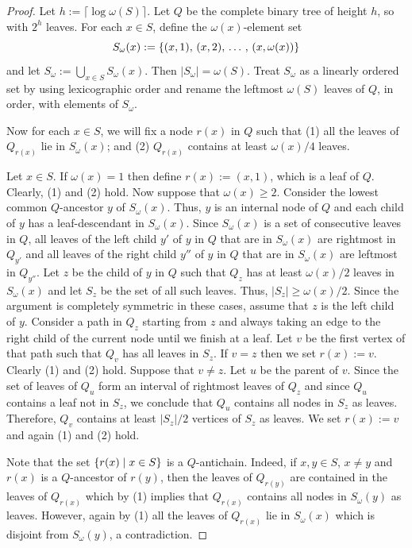 \documentclass{patmorin}
\renewcommand{\geq}{\geqslant}
\DeclarePairedDelimiter{\set}{\{}{\}}
\begin{document}
\begin{proof}
  Let $h:=\lceil\log\omega(S)\rceil$.
  Let $Q$ be the complete binary tree of height $h$, so with $2^h$ leaves.
  For each $x\in S$, define the $\omega(x)$-element set
  \[  S_{\omega}(x):=\set{(x,1),\,(x,2),\,\ldots\,,\,(x,\omega(x))}\]
  and let $S_\omega:=\bigcup_{x\in S}S_{\omega}(x)$.  Then $|S_\omega|=\omega(S)$.  Treat $S_{\omega}$ as a linearly ordered set by using lexicographic order and rename the leftmost $\omega(S)$ leaves of $Q$, in order, with elements of $S_{\omega}$.

  Now for each $x\in S$, we will fix a node $r(x)$ in $Q$ such that
  (1) all the leaves of $Q_{r(x)}$ lie in $S_{\omega}(x)$; and
  (2) $Q_{r(x)}$ contains at least $\omega(x)/4$ leaves.

  Let $x\in S$.
  If $\omega(x)=1$ then define $r(x):=(x,1)$, which is a leaf of $Q$.
  Clearly, (1) and (2) hold.
  Now suppose that $\omega(x)\geq2$.
  Consider the lowest common $Q$-ancestor $y$ of $S_{\omega}(x)$.
  Thus, $y$ is an internal node of $Q$ and each child of $y$ has a leaf-descendant in $S_{\omega}(x)$.
  Since $S_{\omega}(x)$ is a set of consecutive leaves in $Q$,
  all leaves of the left child $y'$ of $y$ in $Q$ that are in $S_{\omega}(x)$ are rightmost in $Q_{y'}$ and
  all leaves of the right child $y''$ of $y$ in $Q$ that are in $S_{\omega}(x)$ are leftmost in $Q_{y''}$.
  Let $z$ be the child of $y$ in $Q$ such that $Q_z$ has at least $\omega(x)/2$ leaves in $S_{\omega}(x)$ and let $S_z$ be the set of all such leaves.
  Thus, $|S_z|\geq \omega(x)/2$.
  Since the argument is completely symmetric in these cases, assume that $z$ is the left child of $y$.
  Consider a path in $Q_z$ starting from $z$ and always taking an edge to the right child of the current node until we finish at a leaf.
  Let $v$ be the first vertex of that path such that $Q_v$ has all leaves in $S_z$.
  If $v=z$ then we set $r(x):=v$. Clearly (1) and (2) hold.
  Suppose that $v\neq z$.
  Let $u$ be the parent of $v$.
  Since the set of leaves of $Q_u$ form an interval of rightmost leaves of $Q_z$ and since $Q_u$ contains a leaf not in $S_z$, we conclude that $Q_u$ contains all nodes in $S_z$ as leaves.
  Therefore, $Q_v$ contains at least $|S_z|/2$ vertices of $S_z$ as leaves.
  We set $r(x):=v$ and again (1) and (2) hold.

  Note that the set $\set{r(x) \mid x\in S}$ is a $Q$-antichain.
  Indeed, if $x,y\in S$, $x\neq y$ and $r(x)$ is a $Q$-ancestor of  $r(y)$, then the leaves of $Q_{r(y)}$ are contained in the leaves of $Q_{r(x)}$ which by (1) implies that $Q_{r(x)}$ contains all nodes in $S_{\omega}(y)$ as leaves.
  However, again by (1) all the leaves of $Q_{r(x)}$ lie in $S_{\omega}(x)$ which is disjoint from $S_{\omega}(y)$, a contradiction.


\end{proof}
\end{document}
